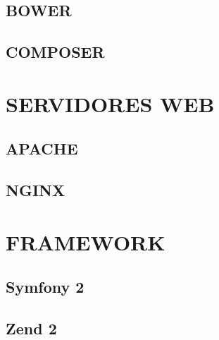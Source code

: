 \documentclass[12pt,floatnumber=continuous,espaco=umemeio]{abnt}
\begin{document}
	\section{BOWER}
	\section{COMPOSER}
	
	\chapter{SERVIDORES WEB}
	\section{APACHE}
	\section{NGINX}
	
	\chapter{FRAMEWORK}
	\section{Symfony 2}
	\section{Zend 2}
	
	
	
	 
	
\end{document}

